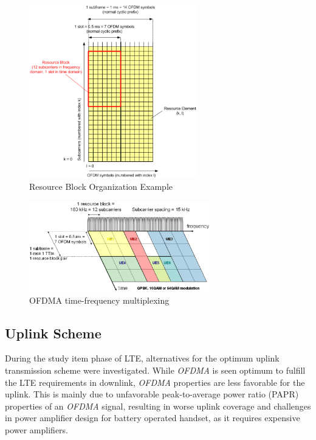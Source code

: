 \begin{figure}[htbp]
    \centering
    \includegraphics[width=0.65\textwidth]{./figures/ofdm_resource_block}
    \caption{ Resource Block Organization Example \cite{umtslte}
    \label{fig:ofdmresblk}}
\end{figure}


\begin{figure}[htbp]
    \centering
    \includegraphics[width=0.70\textwidth]{./figures/downlink_channels}
    \caption{ OFDMA time-frequency multiplexing
    \label{fig:dlchann}}
\end{figure}


\subsection{Uplink Scheme}%

 During the study item phase of LTE, alternatives for the optimum uplink
transmission scheme were investigated. While \textit{OFDMA} is seen optimum to fulfill
the LTE requirements in downlink, \textit{OFDMA} properties are less favorable for the
uplink. This is mainly due to unfavorable peak-to-average power ratio (PAPR)
properties of an \textit{OFDMA} signal, resulting in worse uplink coverage and
challenges in power amplifier design for battery operated handset, as it
requires expensive power amplifiers.

